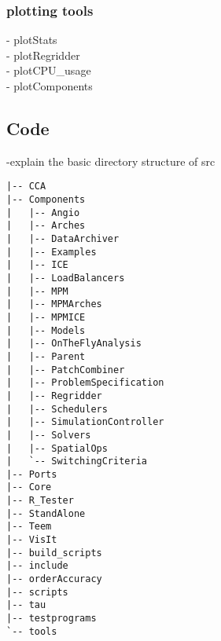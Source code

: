 \subsubsection{plotting tools}
- plotStats\\
- plotRegridder \\
- plotCPU\_usage \\
- plotComponents

\subsection{Code}
-explain the basic directory structure of src
\begin{Verbatim}[fontsize=\footnotesize]
|-- CCA
|-- Components
|   |-- Angio
|   |-- Arches
|   |-- DataArchiver
|   |-- Examples
|   |-- ICE
|   |-- LoadBalancers
|   |-- MPM
|   |-- MPMArches
|   |-- MPMICE
|   |-- Models
|   |-- OnTheFlyAnalysis
|   |-- Parent
|   |-- PatchCombiner
|   |-- ProblemSpecification
|   |-- Regridder
|   |-- Schedulers
|   |-- SimulationController
|   |-- Solvers
|   |-- SpatialOps
|   `-- SwitchingCriteria
|-- Ports
|-- Core
|-- R_Tester
|-- StandAlone
|-- Teem
|-- VisIt
|-- build_scripts
|-- include
|-- orderAccuracy
|-- scripts
|-- tau
|-- testprograms
`-- tools
\end{Verbatim}
